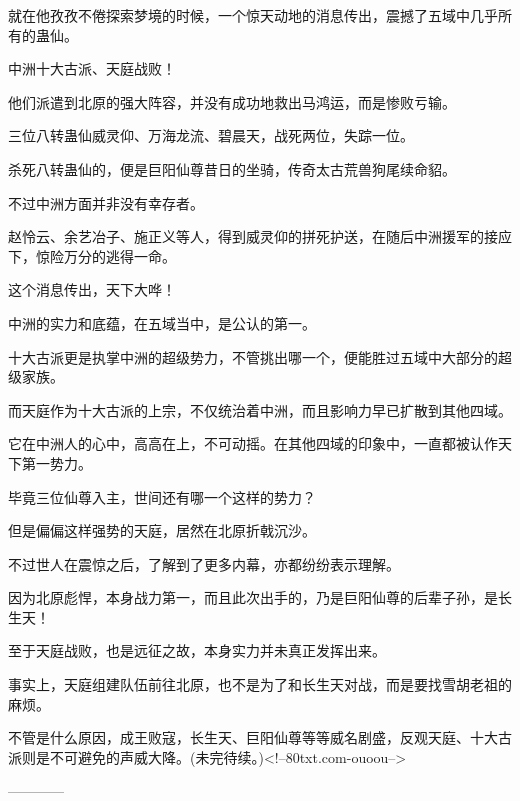 \begin{this_body}
就在他孜孜不倦探索梦境的时候，一个惊天动地的消息传出，震撼了五域中几乎所有的蛊仙。

中洲十大古派、天庭战败！

他们派遣到北原的强大阵容，并没有成功地救出马鸿运，而是惨败亏输。

三位八转蛊仙威灵仰、万海龙流、碧晨天，战死两位，失踪一位。

杀死八转蛊仙的，便是巨阳仙尊昔日的坐骑，传奇太古荒兽狗尾续命貂。

不过中洲方面并非没有幸存者。

赵怜云、余艺冶子、施正义等人，得到威灵仰的拼死护送，在随后中洲援军的接应下，惊险万分的逃得一命。

这个消息传出，天下大哗！

中洲的实力和底蕴，在五域当中，是公认的第一。

十大古派更是执掌中洲的超级势力，不管挑出哪一个，便能胜过五域中大部分的超级家族。

而天庭作为十大古派的上宗，不仅统治着中洲，而且影响力早已扩散到其他四域。

它在中洲人的心中，高高在上，不可动摇。在其他四域的印象中，一直都被认作天下第一势力。

毕竟三位仙尊入主，世间还有哪一个这样的势力？

但是偏偏这样强势的天庭，居然在北原折戟沉沙。

不过世人在震惊之后，了解到了更多内幕，亦都纷纷表示理解。

因为北原彪悍，本身战力第一，而且此次出手的，乃是巨阳仙尊的后辈子孙，是长生天！

至于天庭战败，也是远征之故，本身实力并未真正发挥出来。

事实上，天庭组建队伍前往北原，也不是为了和长生天对战，而是要找雪胡老祖的麻烦。

不管是什么原因，成王败寇，长生天、巨阳仙尊等等威名剧盛，反观天庭、十大古派则是不可避免的声威大降。(未完待续。)<!--80txt.com-ouoou-->

------------

\end{this_body}

